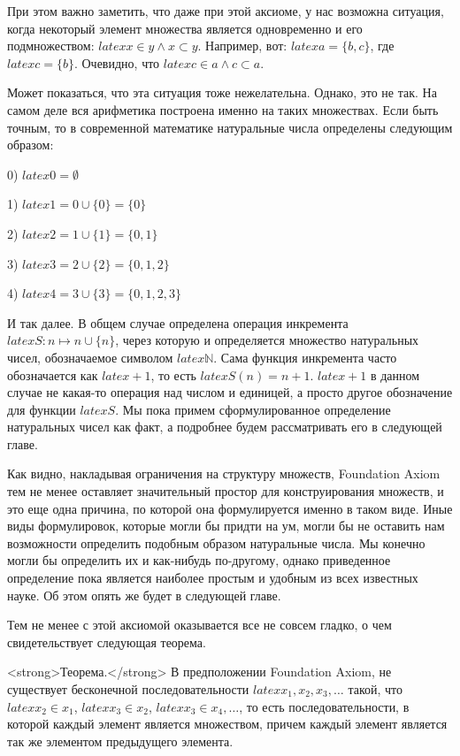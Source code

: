 При этом важно заметить, что даже при этой аксиоме, у нас возможна ситуация, когда некоторый элемент множества является одновременно и его подмножеством: $latex x\in y \wedge x\subset y$. Например, вот: $latex a = \{b, c\}$, где $latex c=\{ b\}$. Очевидно, что $latex c\in a \wedge c\subset a$.

Может показаться, что эта ситуация тоже нежелательна. Однако, это не так. На самом деле вся арифметика построена именно на таких множествах. Если быть точным, то в современной математике натуральные числа определены следующим образом:

0) $latex 0 = \emptyset$

1) $latex 1 = 0 \cup \{0\} = \{0\}$

2) $latex 2 = 1 \cup \{1\} = \{0, 1\}$

3) $latex 3 = 2\cup \{2\} = \{0, 1, 2\}$

4) $latex 4 = 3 \cup \{3\} = \{0, 1, 2, 3\}$

И так далее. В общем случае определена операция инкремента $latex S: n\mapsto n\cup \{n\}$, через которую и определяется множество натуральных чисел, обозначаемое символом $latex \mathbb{N}$. Сама функция инкремента часто обозначается как $latex +1$, то есть $latex S(n) = n+1$. $latex +1$ в данном случае не какая-то операция над числом и единицей, а просто другое обозначение для функции $latex S$. Мы пока примем сформулированное определение натуральных чисел как факт, а подробнее будем рассматривать его в следующей главе.

Как видно, накладывая ограничения на структуру множеств, Foundation Axiom тем не менее оставляет значительный простор для конструирования множеств, и это еще одна причина, по которой она формулируется именно в таком виде.  Иные виды формулировок, которые могли бы придти на ум, могли бы не оставить нам возможности определить подобным образом натуральные числа. Мы конечно могли бы определить их и как-нибудь по-другому, однако приведенное определение пока является наиболее простым и удобным из всех известных науке. Об этом опять же будет в следующей главе.

Тем не менее с этой аксиомой оказывается все не совсем гладко, о чем свидетельствует следующая теорема.

<strong>Теорема.</strong> В предположении Foundation Axiom, не существует бесконечной последовательности $latex x_1, x_2, x_3, \ldots$ такой, что $latex x_2 \in x_1$, $latex x_3 \in x_2$, $latex x_3 \in x_4, \ldots$, то есть последовательности, в которой каждый элемент является множеством, причем каждый элемент является так же элементом предыдущего элемента.


